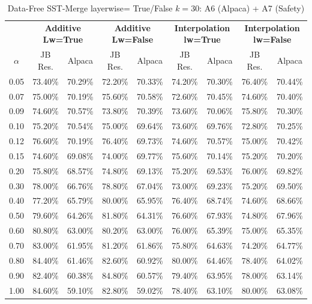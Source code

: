 \begin{table}[h]
\centering
\caption{Data-Free SST-Merge layerwise= True/False $k=30$: A6 (Alpaca) + A7 (Safety)}
\label{tab:res_a6_data_free_sst_30}
\begin{tabular}{c|cc|cc|cc|cc}
\hline
 & \multicolumn{2}{c|}{\textbf{Additive Lw=True}} & \multicolumn{2}{c|}{\textbf{Additive Lw=False}} & \multicolumn{2}{c|}{\textbf{Interpolation lw=True}}& \multicolumn{2}{c}{\textbf{Interpolation lw=False}} \\
$\alpha$ & JB Res. & Alpaca & JB Res. & Alpaca & JB Res. & Alpaca & JB Res. & Alpaca \\
\hline
0.05 & 73.40\% & 70.29\% & 72.20\% & 70.33\% & 74.20\% & 70.30\% & 76.40\% & 70.44\% \\
0.07 & 75.00\% & 70.19\% & 75.60\% & 70.58\% & 72.60\% & 70.45\% & 74.60\% & 70.40\% \\
0.09 & 74.60\% & 70.57\% & 73.80\% & 70.39\% & 73.60\% & 70.06\% & 75.80\% & 70.30\% \\
0.10 & 75.20\% & 70.54\% & 75.00\% & 69.64\% & 73.60\% & 69.76\% & 72.80\% & 70.25\% \\
0.12 & 76.60\% & 70.19\% & 76.40\% & 69.73\% & 74.60\% & 70.57\% & 75.00\% & 70.42\% \\
0.15 & 74.60\% & 69.08\% & 74.00\% & 69.77\% & 75.60\% & 70.14\% & 75.20\% & 70.20\% \\
0.20 & 75.80\% & 68.57\% & 74.80\% & 69.13\% & 75.20\% & 69.53\% & 76.00\% & 69.82\% \\
0.30 & 78.00\% & 66.76\% & 78.80\% & 67.04\% & 73.00\% & 69.23\% & 75.20\% & 69.50\% \\
0.40 & 77.20\% & 65.79\% & 80.00\% & 65.95\% & 76.40\% & 68.74\% & 74.60\% & 68.66\% \\
0.50 & 79.60\% & 64.26\% & 81.80\% & 64.31\% & 76.60\% & 67.93\% & 74.80\% & 67.96\% \\
0.60 & 80.80\% & 63.00\% & 80.20\% & 63.00\% & 76.00\% & 65.39\% & 75.00\% & 65.35\% \\
0.70 & 83.00\% & 61.95\% & 81.20\% & 61.86\% & 75.80\% & 64.63\% & 74.20\% & 64.77\% \\
0.80 & 84.40\% & 61.46\% & 82.60\% & 60.92\% & 80.00\% & 64.46\% & 78.40\% & 64.02\% \\
0.90 & 82.40\% & 60.38\% & 84.80\% & 60.57\% & 79.40\% & 63.95\% & 78.00\% & 63.14\% \\
1.00 & 84.60\% & 59.10\% & 82.80\% & 59.02\% & 78.40\% & 63.10\% & 80.00\% & 63.08\% \\
\hline
\end{tabular}
\end{table}
\FloatBarrier

